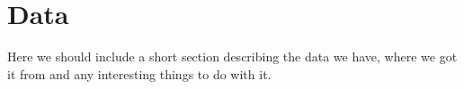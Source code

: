 \section{Data}

Here we should include a short section describing the data we have,
where we got it from and any interesting things to do with it.
